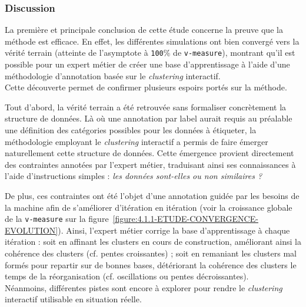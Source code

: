 		\subsubsection{Discussion}
			
			La première et principale conclusion de cette étude concerne la preuve que la méthode est efficace.
			En effet, les différentes simulations ont bien convergé vers la vérité terrain (atteinte de l'asymptote à \texttt{100}\% de \texttt{v-measure}), montrant qu'il est possible pour un expert métier de créer une base d'apprentissage à l'aide d'une méthodologie d'annotation basée sur le \textit{clustering} interactif. \\
			
			
			Cette découverte permet de confirmer plusieurs espoirs portés sur la méthode. 
			
			Tout d'abord, la vérité terrain a été retrouvée sans formaliser concrètement la structure de données.
			Là où une annotation par label aurait requis au préalable une définition des catégories possibles pour les données à étiqueter, la méthodologie employant le \textit{clustering} interactif a permis de faire émerger naturellement cette structure de données.
			Cette émergence provient directement des contraintes annotées par l'expert métier, traduisant ainsi ses connaissances à l'aide d'instructions simples : \textit{les données sont-elles ou non similaires ?}
			
			De plus, ces contraintes ont été l'objet d'une annotation guidée par les besoins de la machine afin de s'améliorer d'itération en itération (voir la croissance globale de la \texttt{v-measure} sur la figure~\ref{figure:4.1.1-ETUDE-CONVERGENCE-EVOLUTION}).
			Ainsi, l'expert métier corrige la base d'apprentissage à chaque itération : soit en affinant les clusters en cours de construction, améliorant ainsi la cohérence des clusters (cf. pentes croissantes) ; soit en remaniant les clusters mal formés pour repartir sur de bonnes bases, détériorant la cohérence des clusters le temps de la réorganisation (cf. oscillations ou pentes décroissantes). \\

			
			Néanmoins, différentes pistes sont encore à explorer pour rendre le \textit{clustering} interactif utilisable en situation réelle.
			
